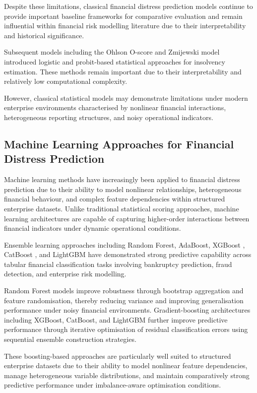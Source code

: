 \documentclass{article}
\begin{document}
Despite these limitations, classical financial distress prediction models continue to provide important baseline frameworks for comparative evaluation and remain influential within financial risk modelling literature due to their interpretability and historical significance.

Subsequent models including the Ohlson O-score \cite{ohlson1980} and Zmijewski model \cite{zmijewski1984} introduced logistic and probit-based statistical approaches for insolvency estimation. These methods remain important due to their interpretability and relatively low computational complexity.

However, classical statistical models may demonstrate limitations under modern enterprise environments characterised by nonlinear financial interactions, heterogeneous reporting structures, and noisy operational indicators.

\subsection{Machine Learning Approaches for Financial Distress Prediction}

Machine learning methods have increasingly been applied to financial distress prediction due to their ability to model nonlinear relationships, heterogeneous financial behaviour, and complex feature dependencies within structured enterprise datasets. Unlike traditional statistical scoring approaches, machine learning architectures are capable of capturing higher-order interactions between financial indicators under dynamic operational conditions.

Ensemble learning approaches including Random Forest, AdaBoost, XGBoost \cite{chen2016xgboost}, CatBoost \cite{prokhorenkova2018catboost}, and LightGBM \cite{ke2017lightgbm} have demonstrated strong predictive capability across tabular financial classification tasks involving bankruptcy prediction, fraud detection, and enterprise risk modelling.

Random Forest models improve robustness through bootstrap aggregation and feature randomisation, thereby reducing variance and improving generalisation performance under noisy financial environments. Gradient-boosting architectures including XGBoost, CatBoost, and LightGBM further improve predictive performance through iterative optimisation of residual classification errors using sequential ensemble construction strategies.

These boosting-based approaches are particularly well suited to structured enterprise datasets due to their ability to model nonlinear feature dependencies, manage heterogeneous variable distributions, and maintain comparatively strong predictive performance under imbalance-aware optimisation conditions.
\end{document}
